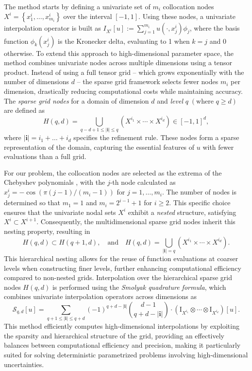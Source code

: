 \documentclass[final,3p,times,11pt]{elsarticle}
\begin{document}
The method starts by defining a univariate set of $m_i$ collocation nodes $X^i = \left\{x_1^i,\ldots, x_{m_i}^i\right\}$ over the interval $[-1,1]$. Using these nodes, a univariate interpolation operator is built as $I_{X^{i}}[u]:=\sum_{j=1}^{m_{i}} u(\cdot, x_j^i)\phi_j$, where the basis function $\phi_k(x_j^i)$ is the Kronecker delta, evaluating to 1 when $k=j$ and $0$ otherwise. To extend this approach to high-dimensional parameter space, the method combines univariate nodes across multiple dimensions using a tensor product. Instead of using a full tensor grid -- which grows exponentially with the number of dimensions $d$ -- the sparse grid framework selects fewer nodes $m_i$ per dimension, drastically reducing computational costs while maintaining accuracy. The {\it sparse grid nodes} for a domain of dimension $d$ and {\it level} $q\; (\text{where }q\ge d)$ are defined as
%
\begin{equation*}
H(q,d) = \bigcup_{q-d+1\le|\boldsymbol{i}|\le q} \left(X^{i_1}\times \cdots\times X^{i_d}\right)\in [-1,1]^d, 
\end{equation*}
where $|\boldsymbol{i}| = i_1+\ldots+i_d$ specifies the refinement rule. These nodes form a sparse representation of the domain, capturing the essential features of $u$ with fewer evaluations than a full grid. 


For our problem, the collocation nodes are selected as the extrema of the Chebyshev polynomials \cite{BaNoRi:2000, ClCu:1960}, with the $j$-th node calculated as $x_j^i=-\cos (\pi(j-1)/(m_i-1))$ for $j=1, \ldots, m_i$. The number of nodes is determined so that $m_1 =1$ and $m_i = 2^{i-1}+1$ for $i\ge 2$. This specific choice ensures that the univariate nodal sets $X^i$ exhibit a {\it nested} structure, satisfying $X^i\subset X^{i+1}$. Consequently, the multidimensional sparse grid nodes inherit this nesting property,  resulting in
%
\begin{equation}
\label{eq:NestedColPts}
H(q,d)\subset H(q+1,d),\quad \text{and}\quad H(q,d) = \bigcup_{|\boldsymbol{i}|=q} \left(X^{i_1}\times \cdots\times X^{i_d}\right).
\end{equation}
%
This hierarchical nesting allows for the reuse of function evaluations at coarser levels when constructing finer levels, further enhancing computational efficiency compared to non-nested grids. Interpolation over the hierarchical sparse grid nodes $H(q,d)$ is performed using the {\it Smolyak quadrature formula}, which combines univariate interpolation operators across dimensions as
%
\begin{equation}
\label{eq: Smolyak_Quad_formula}
\mathcal{S}_{q, d}[u] = \sum_{q+1\le |\boldsymbol{i}|\le q+d} (-1)^{q+d-|\boldsymbol{i}|} \binom{d-1}{q+d-|\boldsymbol{i}|}\cdot \left(\mathrm I_{X^{i_1}}\otimes\cdots\otimes \mathrm I_{X^{i_d}}\right) [u].
\end{equation} 
%
This method efficiently computes high-dimensional interpolations by exploiting the sparsity and hierarchical structure of the grid, providing an effectively balances between computational efficiency and precision, making it particularly suited for solving deterministic parametrized problems involving high-dimensional uncertainties.
\end{document}
